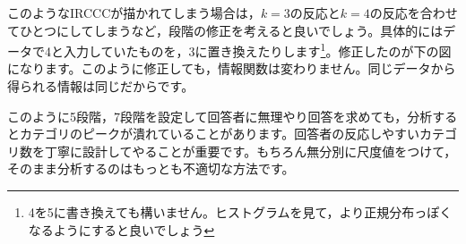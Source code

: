 \documentclass{ltjsbook}
\begin{document}
このようなIRCCCが描かれてしまう場合は，$k=3$の反応と$k=4$の反応を合わせてひとつにしてしまうなど，段階の修正を考えると良いでしょう。具体的にはデータで4と入力していたものを，3に置き換えたりします\footnote{4を5に書き換えても構いません。ヒストグラムを見て，より正規分布っぽくなるようにすると良いでしょう}。修正したのが下の図になります。このように修正しても，情報関数は変わりません。同じデータから得られる情報は同じだからです。

このように5段階，7段階を設定して回答者に無理やり回答を求めても，分析するとカテゴリのピークが潰れていることがあります。回答者の反応しやすいカテゴリ数を丁寧に設計してやることが重要です。もちろん無分別に尺度値をつけて，そのまま分析するのはもっとも不適切な方法です。
\end{document}
